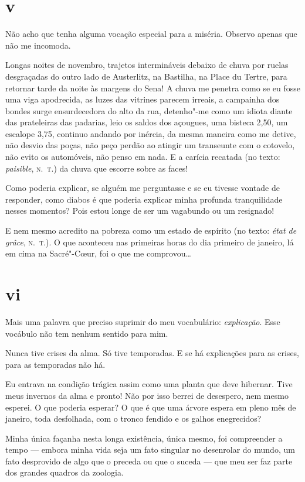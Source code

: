 \section{v}

Não acho que tenha alguma vocação especial para a miséria. Observo
apenas que não me incomoda.

Longas noites de novembro, trajetos intermináveis debaixo de
chuva por ruelas desgraçadas do outro lado de Austerlitz, na Bastilha,
na Place du Tertre, para retornar tarde da noite às margens do Sena! A
chuva me penetra como se eu fosse uma viga apodrecida, as luzes das
vitrines parecem irreais, a campainha dos bondes surge ensurdecedora
do alto da rua, detenho"-me como um idiota diante das prateleiras das
padarias, leio os saldos dos açougues, uma bisteca 2,50, um escalope
3,75, continuo andando por inércia, da mesma maneira como me detive, não
desvio das poças, não peço perdão ao atingir um transeunte com o
cotovelo, não evito os automóveis, não penso em nada. E a carícia
recatada (no texto: \emph{paisible}, \textsc{n.~t.}) da chuva que escorre sobre as
faces!

Como poderia explicar, se alguém me perguntasse e se eu tivesse
vontade de responder, como diabos é que poderia explicar minha
profunda tranquilidade nesses momentos? Pois estou longe de ser um
vagabundo ou um resignado!

E nem mesmo acredito na pobreza como um estado de espírito (no texto:
\emph{état de grâce}, \textsc{n.~t.}). O que aconteceu nas primeiras horas do dia
primeiro de janeiro, lá em cima na Sacré"-C\oe ur, foi o que me
comprovou\ldots{}

\section{vi}

Mais uma palavra que preciso suprimir do meu vocabulário:
\emph{explicação}. Esse vocábulo não tem nenhum sentido para mim.

Nunca tive crises da alma. Só tive temporadas. E se há explicações para
as crises, para as temporadas não há.

Eu entrava na condição trágica assim como uma planta que deve hibernar.
Tive meus invernos da alma e pronto! Não por isso berrei de
desespero, nem mesmo esperei. O que poderia esperar? O que é que uma
árvore espera em pleno mês de janeiro, toda desfolhada, com o tronco
fendido e os galhos enegrecidos?

Minha única façanha nesta longa existência, única mesmo, foi
compreender a tempo --- embora minha vida seja um fato singular no
desenrolar do mundo, um fato desprovido de algo que o preceda ou que o
suceda --- que meu ser faz parte dos grandes quadros da zoologia.

